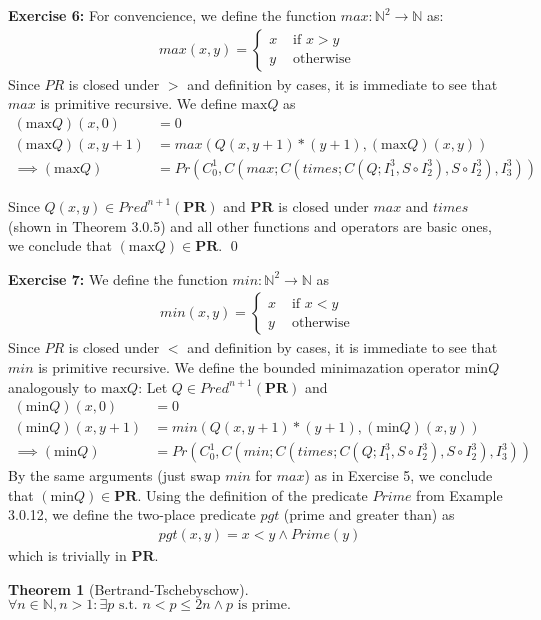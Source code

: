 \documentclass [11pt]{article}
\newcommand{\PR}{\textbf{PR}}
\newtheorem{theorem}{Theorem}
\begin{document}
\bigskip
\noindent
\textbf{Exercise 6:}
For convencience, we define the function $max: \mathbb{N}^2 \rightarrow \mathbb{N}$ as:
\begin{align*}
max(x,y) = \begin{cases}
           x & \text{ if } x > y \\
           y & \text{ otherwise }
           \end{cases}
\end{align*}
Since $PR$ is closed under $>$ and definition by cases, it is immediate to see that $max$ is primitive recursive.
We define $\text{max}Q$ as
\begin{align*}
(\text{max}Q)(x,0) &= 0 \\
(\text{max}Q)(x,y+1) &= max(Q(x,y+1) * (y+1), (\text{max}Q)(x,y)) \\
\implies (\text{max}Q) &= Pr(C^1_0, C(max; C(times; C(Q; I^3_1, S \circ I^3_2), S \circ I^3_2) , I^3_3))
\end{align*}

Since $Q(x,y) \in Pred^{n+1}(\PR)$ and $\PR$ is closed under $max$ and $times$ (shown in Theorem 3.0.5) and all other functions and operators are basic ones, we conclude that $(\text{max}Q) \in \PR$.
\qed

\bigskip
\noindent
\textbf{Exercise 7:}
We define the function $min: \mathbb{N}^2 \rightarrow \mathbb{N}$ as 
\begin{align*}
min(x,y) = \begin{cases}
           x & \text{ if } x < y \\
           y & \text{ otherwise }
           \end{cases}
\end{align*}
Since $PR$ is closed under $<$ and definition by cases, it is immediate to see that $min$ is primitive recursive.
We define the bounded minimazation operator $\text{min}Q$ analogously to $\text{max}Q$: 
Let $Q \in Pred^{n+1}(\PR)$ and 
\begin{align*}
(\text{min}Q)(x,0) &= 0 \\
(\text{min}Q)(x,y+1) &= min(Q(x,y+1) * (y+1), (\text{min}Q)(x,y)) \\
\implies (\text{min}Q) &= Pr(C^1_0, C(min; C(times; C(Q; I^3_1, S \circ I^3_2), S \circ I^3_2) , I^3_3))
\end{align*}
By the same arguments (just swap $min$ for $max$) as in Exercise 5, we conclude that $(\text{min}Q) \in \PR$. 
Using the definition of the predicate $Prime$ from Example 3.0.12, we define the two-place predicate $pgt$ (prime and greater than) as
\begin{align*}
pgt(x,y) = x < y \land Prime(y) 
\end{align*}
which is trivially in $\PR$.
\begin{theorem}[Bertrand-Tschebyschow]
$\forall n\in \mathbb{N}, n > 1 : \exists p \text{ s.t.~}  n < p \leq 2n \land p \text{ is prime.}$
\end{theorem}
\end{document}
